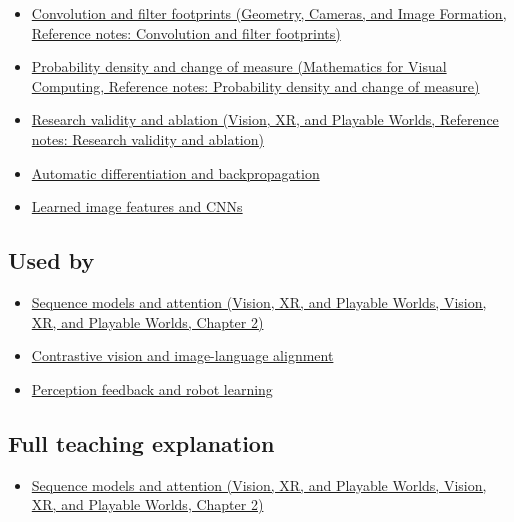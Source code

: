 \begin{itemize}
\tightlist
\item
  \href{../03-Geometry-Cameras-and-Image-Formation/main.pdf\#nameddest=appendix-d5b3c692d9f0}{Convolution and filter footprints (Geometry, Cameras, and Image Formation, Reference notes: Convolution and filter footprints)}
\item
  \href{../02-Mathematics-for-Visual-Computing/main.pdf\#nameddest=appendix-4815cd87ab8b}{Probability density and change of measure (Mathematics for Visual Computing, Reference notes: Probability density and change of measure)}
\item
  \href{../07-Vision-XR-and-Playable-Worlds/main.pdf\#nameddest=appendix-65788587ef78}{Research validity and ablation (Vision, XR, and Playable Worlds, Reference notes: Research validity and ablation)}
\item
  \hyperref[appendix-40df0855b4a7]{Automatic differentiation and backpropagation}
\item
  \hyperref[appendix-47c51ea026fb]{Learned image features and CNNs}
\end{itemize}

\subsection{Used by}\label{appendix-a9d5dfdd164a-used-by}

\begin{itemize}
\tightlist
\item
  \href{../07-Vision-XR-and-Playable-Worlds/main.pdf\#nameddest=04-visual-computing-ii-ch031-sequence-models-and-attention}{Sequence models and attention (Vision, XR, and Playable Worlds, Vision, XR, and Playable Worlds, Chapter 2)}
\item
  \hyperref[appendix-772f1fd96148]{Contrastive vision and image-language alignment}
\item
  \hyperref[appendix-b0c42da325f1]{Perception feedback and robot learning}
\end{itemize}

\subsection{Full teaching explanation}\label{appendix-a9d5dfdd164a-full-teaching-explanation}

\begin{itemize}
\tightlist
\item
  \href{../07-Vision-XR-and-Playable-Worlds/main.pdf\#nameddest=04-visual-computing-ii-ch031-sequence-models-and-attention}{Sequence models and attention (Vision, XR, and Playable Worlds, Vision, XR, and Playable Worlds, Chapter 2)}
\end{itemize}

